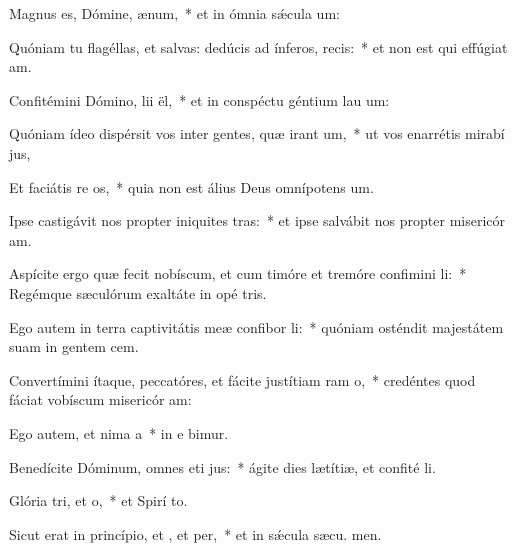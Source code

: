 \item Magnus es, Dómine,  ænum,~* et in ómnia sǽcula  um:
\item Quóniam tu flagéllas, et salvas: dedúcis ad ínferos,  recis:~* et non est qui effúgiat  am.
\item Confitémini Dómino, lii ël,~* et in conspéctu géntium lau um:
\item Quóniam ídeo dispérsit vos inter gentes, quæ irant um,~* ut vos enarrétis mirabí jus,
\item Et faciátis re os,~* quia non est álius Deus omnípotens  um.
\item Ipse castigávit nos propter iniquites tras:~* et ipse salvábit nos propter misericór am.
\item Aspícite ergo quæ fecit nobíscum, et cum timóre et tremóre confimini li:~* Regémque sæculórum exaltáte in opé tris.
\item Ego autem in terra captivitátis meæ confibor li:~* quóniam osténdit majestátem suam in gentem cem.
\item Convertímini ítaque, peccatóres, et fácite justítiam ram o,~* credéntes quod fáciat vobíscum misericór am:
\item Ego autem, et nima a~* in e bimur.
\item Benedícite Dóminum, omnes eti jus:~* ágite dies lætítiæ, et confité li.
\item Glória tri, et o,~* et Spirí to.
\item Sicut erat in princípio, et , et per,~* et in sǽcula sæcu. men.
